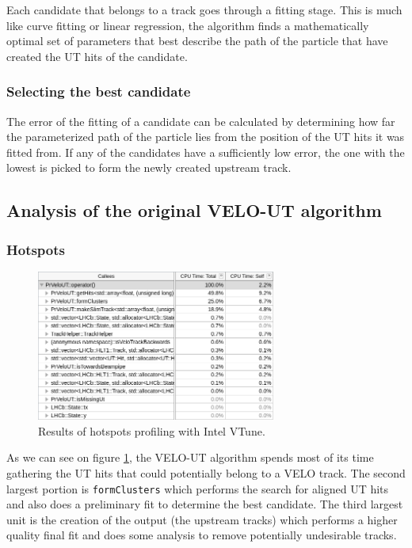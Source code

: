 \documentclass[12pt]{article}
\newcommand{\code}[1]{\texttt{#1}}
\begin{document}
Each candidate that belongs to a track goes through a fitting stage. This is much like curve fitting or linear regression, the algorithm finds a mathematically optimal set of parameters that best describe the path of the particle that have created the UT hits of the candidate. 


\subsubsection{Selecting the best candidate}

The error of the fitting of a candidate can be calculated by determining how far the parameterized path of the particle lies from the position of the UT hits it was fitted from. If any of the candidates have a sufficiently low error, the one with the lowest is picked to form the newly created upstream track.


\subsection{Analysis of the original VELO-UT algorithm}

\subsubsection{Hotspots}

\begin{figure}[H]
	\begin{center}
		\includegraphics[width=0.7\textwidth]{velout_hotspots_orig}
	\end{center}
	\caption[CPU hotspots of the unoptimized VELO-UT algorithm]{Results of hotspots profiling with Intel VTune.}
	\label{fig_velout_hotspots_orig}
\end{figure}

As we can see on figure \ref{fig_velout_hotspots_orig}, the VELO-UT algorithm spends most of its time gathering the UT hits that could potentially belong to a VELO track. The second largest portion is \code{formClusters} which performs the search for aligned UT hits and also does a preliminary fit to determine the best candidate. The third largest unit is the creation of the output (the upstream tracks) which performs a higher quality final fit and does some analysis to remove potentially undesirable tracks.
\end{document}
